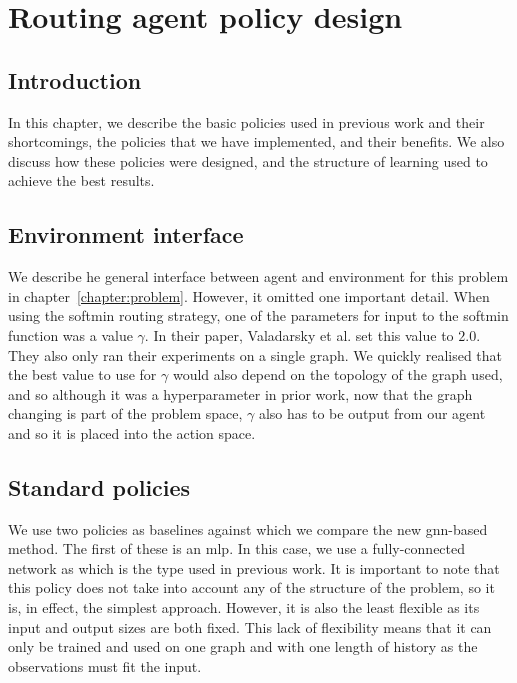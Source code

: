 \chapter{Routing agent policy design}
\label{chapter:learning}

 \section{Introduction}
In this chapter, we describe the basic policies used in previous work and their shortcomings, the policies that we have implemented, and their benefits. We also discuss how these policies were designed, and the structure of learning used to achieve the best results.

\section{Environment interface}
We describe he general interface between agent and environment for this problem in chapter~\ref{chapter:problem}. However, it omitted one important detail. When using the softmin routing strategy, one of the parameters for input to the softmin function was a value $\gamma$. In their paper, Valadarsky et al.\cite{valadarsky2017learning} set this value to $2.0$. They also only ran their experiments on a single graph. We quickly realised that the best value to use for $\gamma$ would also depend on the topology of the graph used, and so although it was a hyperparameter in prior work, now that the graph changing is part of the problem space, $\gamma$ also has to be output from our agent and so it is placed into the action space.

\section{Standard policies}
We use two policies as baselines against which we compare the new \ac{gnn}-based method. The first of these is an \acf{mlp}\cite{rumelhart1986learning}. In this case, we use a fully-connected network as which is the type used in previous work. It is important to note that this policy does not take into account any of the structure of the problem, so it is, in effect, the simplest approach. However, it is also the least flexible as its input and output sizes are both fixed. This lack of flexibility means that it can only be trained and used on one graph and with one length of history as the observations must fit the input.

